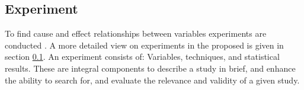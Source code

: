 
\subsection{Experiment}
\label{subsec:experiment}

To find cause and effect relationships between variables experiments are conducted \cite{BuddiesVariables}. A more detailed view on experiments in the proposed \checklist is given in section \ref{subsec:experiment}. An experiment consists of: Variables, techniques, and statistical results. These are integral components to describe a study in brief, and enhance the ability to search for, and evaluate the relevance and validity of a given study.